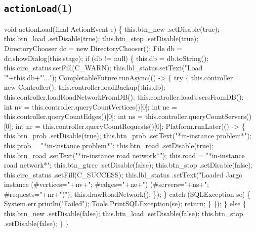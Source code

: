 \subsection{\texttt{actionLoad}(1)}
\nwenddocs{}\endmoddef{}
void actionLoad(final ActionEvent e) \{
  this.btn_new      .setDisable(true);
  this.btn_load     .setDisable(true);
  this.btn_stop     .setDisable(true);
  DirectoryChooser dc = new DirectoryChooser();
  File db = dc.showDialog(this.stage);
  if (db != null) \{
    this.db = db.toString();
    this.circ_status.setFill(C_WARN);
    this.lbl_status.setText("Load '"+this.db+"'...");
    CompletableFuture.runAsync(() -> \{
      try \{
        this.controller = new Controller();
        this.controller.loadBackup(this.db);
        this.controller.loadRoadNetworkFromDB();
        this.controller.loadUsersFromDB();
        int nv = this.controller.queryCountVertices()[0];
        int ne = this.controller.queryCountEdges()[0];
        int ns = this.controller.queryCountServers()[0];
        int nr = this.controller.queryCountRequests()[0];
        Platform.runLater(() -> \{
          this.btn_prob     .setDisable(true);
          this.btn_prob     .setText("*in-instance problem*");
          this.prob = "*in-instance problem*";
          this.btn_road     .setDisable(true);
          this.btn_road     .setText("*in-instance road network*");
          this.road = "*in-instance road network*";
          this.btn_gtree    .setDisable(false);
          this.btn_stop     .setDisable(false);
          this.circ_status  .setFill(C_SUCCESS);
          this.lbl_status   .setText("Loaded Jargo instance (#vertices="+nv+"; #edges="+ne+") (#servers="+ns+"; #requests="+nr+")");
          this.drawRoadNetwork();
        \});
      \} catch (SQLException se) \{
        System.err.println("Failed");
        Tools.PrintSQLException(se);
        return;
      \}
    \});
  \} else \{
    this.btn_new      .setDisable(false);
    this.btn_load     .setDisable(false);
    this.btn_stop     .setDisable(false);
  \}
\}
\eatline
